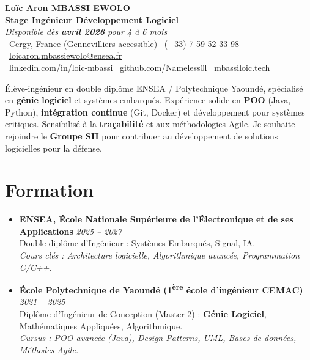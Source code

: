 \documentclass[a4paper,11pt]{article}
\begin{document}
\begin{center}
    {\Large \textbf{Loïc Aron MBASSI EWOLO}} \\ \vspace{4pt}
    \textbf{\large Stage Ingénieur Développement Logiciel} \\
    \textit{\small Disponible dès \textbf{avril 2026} pour 4 à 6 mois} \\ \vspace{4pt}
    \small
    \faMapMarker\ Cergy, France (Gennevilliers accessible) \quad
    \faPhone\ (+33) 7 59 52 33 98 \quad
    \faEnvelope\ \href{mailto:loicaron.mbassiewolo@ensea.fr}{loicaron.mbassiewolo@ensea.fr} \\ \vspace{2pt}
    \faLinkedin\ \href{https://www.linkedin.com/in/loic-mbassi/}{linkedin.com/in/loic-mbassi} \quad
    \faGithub\ \href{https://github.com/Nameless0l}{github.com/Nameless0l} \quad
    \faGlobe\ \href{https://mbassiloic.tech}{mbassiloic.tech}
\end{center}

\vspace{-6pt}

\noindent\small{Élève-ingénieur en double diplôme ENSEA / Polytechnique Yaoundé, spécialisé en \textbf{génie logiciel} et systèmes embarqués. Expérience solide en \textbf{POO} (Java, Python), \textbf{intégration continue} (Git, Docker) et développement pour systèmes critiques. Sensibilisé à la \textbf{traçabilité} et aux méthodologies Agile. Je souhaite rejoindre le \textbf{Groupe SII} pour contribuer au développement de solutions logicielles pour la défense.}

\section{Formation}
\begin{itemize}[leftmargin=*, label=\tiny$\bullet$, nosep]
    \item \textbf{ENSEA, École Nationale Supérieure de l'Électronique et de ses Applications} \hfill \textit{2025 -- 2027} \\
    \small{Double diplôme d'Ingénieur : Systèmes Embarqués, Signal, IA.} \\
    \textit{\small{Cours clés : Architecture logicielle, Algorithmique avancée, Programmation C/C++.}}
    \item \textbf{École Polytechnique de Yaoundé (1\textsuperscript{ère} école d'ingénieur CEMAC)} \hfill \textit{2021 -- 2025} \\
    \small{Diplôme d'Ingénieur de Conception (Master 2) : \textbf{Génie Logiciel}, Mathématiques Appliquées, Algorithmique.} \\
    \textit{\small{Cursus : POO avancée (Java), Design Patterns, UML, Bases de données, Méthodes Agile.}}
\end{itemize}
\end{document}
